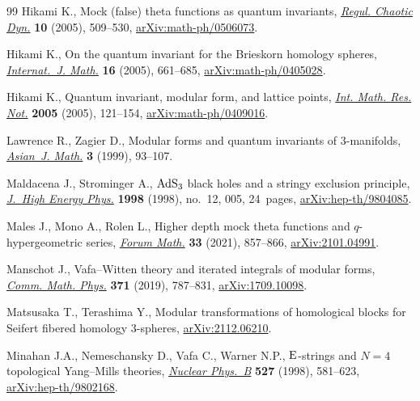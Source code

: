 \documentclass[pdftex]{sigma}
\theoremstyle{definition}
\numberwithin{equation}{section}
\begin{document}
\begin{thebibliography}{99}
Hikami K., Mock (false) theta functions as quantum invariants, \href{https://doi.org/10.1070/RD2005v010n04ABEH000328}{\textit{Regul.
 Chaotic Dyn.}} \textbf{10} (2005), 509--530, \href{https://arxiv.org/abs/math-ph/0506073}{arXiv:math-ph/0506073}.

Hikami K., On the quantum invariant for the {B}rieskorn homology spheres,
 \href{https://doi.org/10.1142/S0129167X05003004}{\textit{Internat.~J. Math.}} \textbf{16} (2005), 661--685,
 \href{https://arxiv.org/abs/math-ph/0405028}{arXiv:math-ph/0405028}.

Hikami K., Quantum invariant, modular form, and lattice points, \href{https://doi.org/10.1155/IMRN.2005.121}{\textit{Int.
 Math. Res. Not.}} \textbf{2005} (2005), 121--154, \href{https://arxiv.org/abs/math-ph/0409016}{arXiv:math-ph/0409016}.

Lawrence R., Zagier D., Modular forms and quantum invariants of
 {$3$}-manifolds, \href{https://doi.org/10.4310/AJM.1999.v3.n1.a5}{\textit{Asian~J. Math.}} \textbf{3} (1999), 93--107.

Maldacena J., Strominger A., {${\rm AdS}_3$} black holes and a stringy
 exclusion principle, \href{https://doi.org/10.1088/1126-6708/1998/12/005}{\textit{J.~High Energy Phys.}} \textbf{1998} (1998),
 no.~12, 005, 24~pages, \href{https://arxiv.org/abs/hep-th/9804085}{arXiv:hep-th/9804085}.

Males J., Mono A., Rolen L., Higher depth mock theta functions and
 {$q$}-hypergeometric series, \href{https://doi.org/10.1515/forum-2021-0013}{\textit{Forum Math.}} \textbf{33} (2021),
 857--866, \href{https://arxiv.org/abs/2101.04991}{arXiv:2101.04991}.

Manschot J., Vafa--{W}itten theory and iterated integrals of modular forms,
 \href{https://doi.org/10.1007/s00220-019-03389-5}{\textit{Comm. Math. Phys.}} \textbf{371} (2019), 787--831,
 \href{https://arxiv.org/abs/1709.10098}{arXiv:1709.10098}.

Matsusaka T., Terashima Y., Modular transformations of homological blocks for
 {S}eifert fibered homology $3$-spheres, \href{https://arxiv.org/abs/2112.06210}{arXiv:2112.06210}.

Minahan J.A., Nemeschansky D., Vafa C., Warner N.P., {${\rm E}$}-strings and
 {$N=4$} topological {Y}ang--{M}ills theories, \href{https://doi.org/10.1016/S0550-3213(98)00426-X}{\textit{Nuclear Phys.~B}}
 \textbf{527} (1998), 581--623, \href{https://arxiv.org/abs/hep-th/9802168}{arXiv:hep-th/9802168}.


\end{thebibliography}
\end{document}
